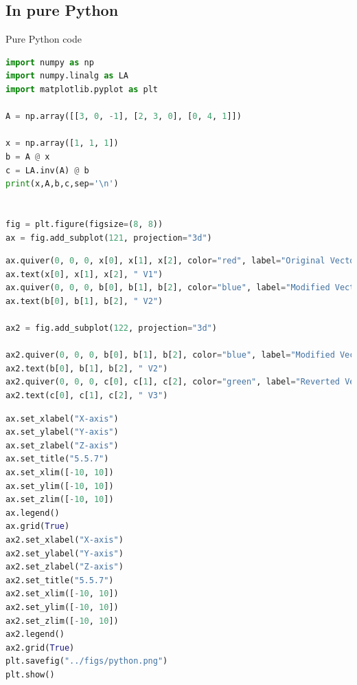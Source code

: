 \documentclass{beamer}
\theoremstyle{remark}
\numberwithin{equation}{section}
\begin{document}
\subsection{In pure Python}
\begin{frame}[fragile]{Pure Python code}
 \begin{lstlisting}[language=Python]
import numpy as np
import numpy.linalg as LA
import matplotlib.pyplot as plt

A = np.array([[3, 0, -1], [2, 3, 0], [0, 4, 1]])

x = np.array([1, 1, 1])
b = A @ x
c = LA.inv(A) @ b
print(x,A,b,c,sep='\n')


fig = plt.figure(figsize=(8, 8))
ax = fig.add_subplot(121, projection="3d")
\end{lstlisting}
\end{frame}
\begin{frame}[fragile]
\begin{lstlisting}[language=Python]
ax.quiver(0, 0, 0, x[0], x[1], x[2], color="red", label="Original Vector")
ax.text(x[0], x[1], x[2], " V1")
ax.quiver(0, 0, 0, b[0], b[1], b[2], color="blue", label="Modified Vector")
ax.text(b[0], b[1], b[2], " V2")

ax2 = fig.add_subplot(122, projection="3d")

ax2.quiver(0, 0, 0, b[0], b[1], b[2], color="blue", label="Modified Vector")
ax2.text(b[0], b[1], b[2], " V2")
ax2.quiver(0, 0, 0, c[0], c[1], c[2], color="green", label="Reverted Vector")
ax2.text(c[0], c[1], c[2], " V3")

\end{lstlisting}
\end{frame}
\begin{frame}[fragile]
\begin{lstlisting}[language=Python]
ax.set_xlabel("X-axis")
ax.set_ylabel("Y-axis")
ax.set_zlabel("Z-axis")
ax.set_title("5.5.7")
ax.set_xlim([-10, 10])
ax.set_ylim([-10, 10])
ax.set_zlim([-10, 10])
ax.legend()
ax.grid(True)
ax2.set_xlabel("X-axis")
ax2.set_ylabel("Y-axis")
ax2.set_zlabel("Z-axis")
ax2.set_title("5.5.7")
ax2.set_xlim([-10, 10])
ax2.set_ylim([-10, 10])
ax2.set_zlim([-10, 10])
ax2.legend()
ax2.grid(True)
plt.savefig("../figs/python.png")
plt.show()
\end{lstlisting}
\end{frame}
\end{document}
